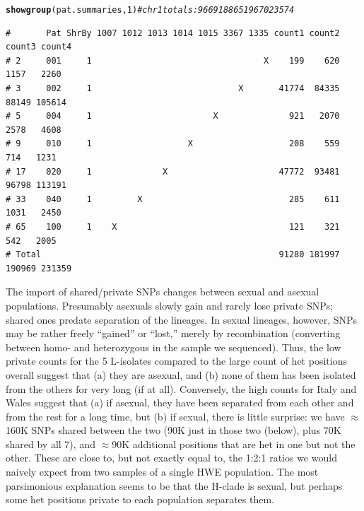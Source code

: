 \documentclass{article}\usepackage[]{graphicx}\usepackage[]{color}
\makeatletter
\newcommand{\hlnum}[1]{\textcolor[rgb]{0.686,0.059,0.569}{#1}}%
\newcommand{\hlcom}[1]{\textcolor[rgb]{0.678,0.584,0.686}{\textit{#1}}}%
\newcommand{\hlstd}[1]{\textcolor[rgb]{0.345,0.345,0.345}{#1}}%
\newcommand{\hlkwd}[1]{\textcolor[rgb]{0.737,0.353,0.396}{\textbf{#1}}}%
\newenvironment{kframe}{%
 \def\at@end@of@kframe{}%
 \ifinner\ifhmode%
  \def\at@end@of@kframe{\end{minipage}}%
  \begin{minipage}{\columnwidth}%
 \fi\fi%
 \def\FrameCommand##1{\hskip\@totalleftmargin \hskip-\fboxsep
 \colorbox{shadecolor}{##1}\hskip-\fboxsep
     \hskip-\linewidth \hskip-\@totalleftmargin \hskip\columnwidth}%
 \MakeFramed {\advance\hsize-\width
   \@totalleftmargin\z@ \linewidth\hsize
   \@setminipage}}%
 {\par\unskip\endMakeFramed%
 \at@end@of@kframe}
\newenvironment{knitrout}{}{} %
\makeatother
\begin{document}
\begin{knitrout}\footnotesize
{}\color{fgcolor}\begin{kframe}
\begin{alltt}
\hlkwd{showgroup}\hlstd{(pat.summaries,}\hlnum{1}\hlstd{)}  \hlcom{# chr1 totals: 9669  18865  19670  23574}
\end{alltt}
\begin{verbatim}
#       Pat ShrBy 1007 1012 1013 1014 1015 3367 1335 count1 count2 count3 count4
# 2     001     1                                  X    199    620   1157   2260
# 3     002     1                             X       41774  84335  88149 105614
# 5     004     1                        X              921   2070   2578   4608
# 9     010     1                   X                   208    559    714   1231
# 17    020     1              X                      47772  93481  96798 113191
# 33    040     1         X                             285    611   1031   2450
# 65    100     1    X                                  121    321    542   2005
# Total                                               91280 181997 190969 231359
\end{verbatim}
\end{kframe}
\end{knitrout}

The import of shared/private SNPs changes between sexual and asexual populations.  Presumably asexuals 
slowly gain and rarely lose private SNPs; shared ones predate separation of the lineages.  In sexual 
lineages, however, SNPs may be rather freely ``gained'' or ``lost,'' merely by recombination (converting 
between homo- and heterozygous in the sample we sequenced). Thus, the low private counts for the 5 
L-isolates compared to the large count of het positions overall suggest that (a) they are asexual, 
and (b) none of them has been isolated from the others for very long (if at all).  Conversely, the 
high counts for Italy and Wales suggest that (a) if asexual, they have been separated from each other 
and from the rest for a long time, but (b) if sexual, there is little surprise: we have $\approx$160K 
SNPs shared between the two (90K just in those two (below), plus 70K shared by all 7), and $\approx$90K 
additional positions that are het in one but not the other.  These are close to, but not exactly equal 
to, the 1:2:1 ratios we would naively expect from two samples of a single HWE population.  The most 
parsimonious explanation seems to be that the H-clade is sexual, but perhaps some het positions private 
to each population separates them.
\end{document}
